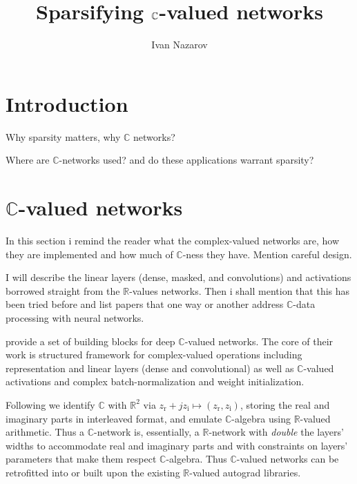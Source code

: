 \documentclass[a4paper,10pt]{article}
\title{Sparsifying $\cplx$-valued networks}
\author{Ivan Nazarov}
\newcommand{\real}{\mathbb{R}}
\newcommand{\cplx}{\mathbb{C}}
\begin{document}
\maketitle


\section{Introduction} %
\label{sec:introduction}

Why sparsity matters, why $\cplx$ networks?

Where are $\cplx$-networks used? and do these applications warrant sparsity?


\section{$\cplx$-valued networks} %
\label{sec:c_valued_networks}

In this section i remind the reader what the complex-valued networks are, how
they are implemented and how much of $\cplx$-ness they have. Mention careful
design.

I will describe the linear layers (dense, masked, and convolutions) and
activations borrowed straight from the $\real$-values networks. Then i shall
mention that this has been tried before and list papers that one way or another
address $\cplx$-data processing with neural networks.

\cite{trabelsi_deep_2017} provide a set of building blocks for deep $\cplx$-valued
networks. The core of their work is structured framework for complex-valued operations
including representation and linear layers (dense and convolutional) as well
as $\cplx$-valued activations and complex batch-normalization and weight initialization.

Following \cite{trabelsi_deep_2017} we identify $\cplx$ with $\real^2$ via $
  z_\mathrm{r} + j z_\mathrm{i} \mapsto (z_\mathrm{r}, z_\mathrm{i})
$, storing the real and imaginary parts in interleaved format, and emulate $\cplx$-algebra
using $\real$-valued arithmetic. Thus a $\cplx$-network is, essentially, a $\real$-network
with \textit{double} the layers' widths to accommodate real and imaginary parts and
with constraints on layers' parameters that make them respect $\cplx$-algebra. Thus
$\cplx$-valued networks can be retrofitted into or built upon the existing $\real$-valued
autograd libraries.
\end{document}
